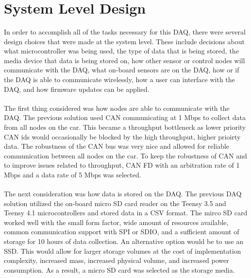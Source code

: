 \section{System Level Design}

\paragraph{}
In order to accomplish all of the tasks necessary for this DAQ, there were several design choices that were made at the system level.
These include decisions about what microcontroller was being used, the type of data that is being stored, the media device that data is being stored on, how other sensor or control nodes will communicate with the DAQ, what on-board sensors are on the DAQ, how or if the DAQ is able to communicate wirelessly, how a user can interface with the DAQ, and how firmware updates can be applied.

\paragraph{}
The first thing considered was how nodes are able to communicate with the DAQ.
The previous solution used CAN communicating at 1 Mbps to collect data from all nodes on the car.
This became a throughput bottleneck as lower priority CAN ids would occasionally be blocked by the high throughput, higher prioirty data.
The robustness of the CAN bus was very nice and allowed for reliable communication between all nodes on the car.
To keep the robustness of CAN and to improve issues related to throughput, CAN FD with an arbitration rate of 1 Mbps and a data rate of 5 Mbps was selected.

\paragraph{}
The next consideration was how data is stored on the DAQ.
The previous DAQ solution utilized the on-board micro SD card reader on the Teensy 3.5 and Teensy 4.1 microcontrollers and stored data in a CSV format.
The mirco SD card worked well with the small form factor, wide amount of resources available, common communication support with SPI or SDIO, and a sufficient amount of storage for 10 hours of data collection.
An alternative option would be to use an SSD.
This would allow for larger storage volumes at the cost of implementation complexity, increased mass, increased physical volume, and increased power consumption.
As a result, a micro SD card was selected as the storage media.

